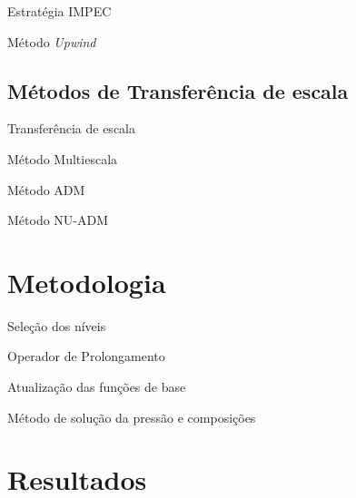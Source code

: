 \documentclass[professionalfont]{beamer}
\begin{document}
\begin{frame}{Estratégia IMPEC}
    
\end{frame}


\begin{frame}{Método \textit{Upwind}}
    
\end{frame}

\subsection{Métodos de Transferência de escala}
\begin{frame}{Transferência de escala}
    
\end{frame}

\begin{frame}{Método Multiescala}
    
\end{frame}

\begin{frame}{Método ADM}
    
\end{frame}

\begin{frame}{Método NU-ADM}


\end{frame}

\section{Metodologia}
\begin{frame}{Seleção dos níveis}
    
\end{frame}

\begin{frame}{Operador de Prolongamento}
    
\end{frame}

\begin{frame}{Atualização das funções de base}
    
\end{frame}

\begin{frame}{Método de solução da pressão e composições}
    
\end{frame}

\section{Resultados}
\end{document}
